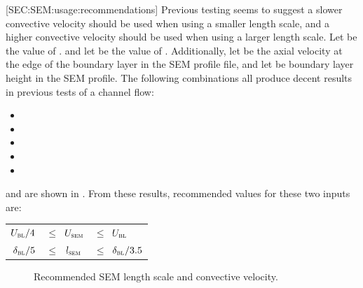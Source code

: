 
%
[SEC:SEM:usage:recommendations]
%
Previous testing seems to suggest a slower convective velocity should be used
when using a smaller length scale, and a higher convective velocity should be
used when using a larger length scale.
%
Let \uSEM{} be the value of
.
and let \lSEM{} be the value of
.
%
%
Additionally, let \uBC{} be the axial velocity at the edge of the
boundary layer in the SEM profile file, and let
\lBC{} be boundary layer height in the SEM profile.
%
The following combinations all produce decent results in previous
tests of a channel flow:
%
\begin{itemize}[left=2.0em,align=left,style=nextline,noitemsep]
  \item[$\uSEM = \uBC/4\;$; $\quad\lSEM = \lBC/5$]
  \item[$\uSEM = \uBC/2\;$; $\quad\lSEM = \lBC/5$]
  \item[$\uSEM = \uBC/2\;$; $\quad\lSEM = \lBC/4$]
  \item[$\uSEM = \uBC/2\;$; $\quad\lSEM = \lBC/3.75$]
  \item[$\uSEM = \uBC/1\;$; $\quad\lSEM = \lBC/3.75$]
\end{itemize}
%
and are shown in .
%
From these results, recommended values for these two inputs are:
\\[8pt]
\begin{tabular}{ @{\hspace{2.0em}} rcccl @{} } 
  $U_{\textsc{bl}}/4$ & $\!\!\!\le$ & $\!\!\!U_{\textsc{sem}}$ & $\!\!\!\le$ & $\!\!\!U_{\textsc{bl}}$ \\
  $\delta_{\textsc{bl}}/5$ & $\!\!\!\le$ & $\!\!\!l_{\textsc{sem}}$ & $\!\!\!\le$ & $\!\!\!\delta_{\textsc{bl}}/3.5$
\end{tabular}

\begin{figure}[h]
  \begin{centering}
    \caption{Recommended SEM length scale and convective velocity.}
    \label{FIG:SEM_Recommendations}
  \end{centering}
\end{figure}

